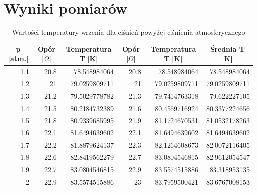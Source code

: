 \documentclass{article}
\begin{document}

 


\section{Wyniki pomiarów}

\begin{table}[htbp]
\centering
\begin{tabular}{|r|r|r|r|r|r|}
\hline
\multicolumn{1}{|c|}{p [atm.]} & \multicolumn{1}{c|}{Opór [$\Omega$]} & \multicolumn{1}{c|}{Temperatura T [K]} & \multicolumn{1}{c|}{Opór [$\Omega$]} & \multicolumn{1}{c|}{Temperatura T [K]} & \multicolumn{1}{c|}{Średnia T [K]} \\ \hline
1.1 & 20.8 & 78.548984064 & 20.8 & 78.548984064 & 78.548984064 \\ \hline
1.2 & 21 & 79.0259809711 & 21 & 79.0259809711 & 79.0259809711 \\ \hline
1.3 & 21.2 & 79.5029778782 & 21.3 & 79.7414763318 & 79.622227105 \\ \hline
1.4 & 21.5 & 80.2184732389 & 21.6 & 80.4569716924 & 80.3377224656 \\ \hline
1.5 & 21.8 & 80.9339685995 & 21.9 & 81.1724670531 & 81.0532178263 \\ \hline
1.6 & 22.1 & 81.6494639602 & 22.1 & 81.6494639602 & 81.6494639602 \\ \hline
1.7 & 22.2 & 81.8879624137 & 22.3 & 82.1264608673 & 82.0072116405 \\ \hline
1.8 & 22.6 & 82.8419562279 & 22.7 & 83.0804546815 & 82.9612054547 \\ \hline
1.9 & 22.7 & 83.0804546815 & 22.9 & 83.5574515886 & 83.318953135 \\ \hline
2 & 22.9 & 83.5574515886 & 23 & 83.7959500421 & 83.6767008153 \\ \hline
\end{tabular}
\caption{Wartości temperatury wrzenia dla ciśnień powyżej ciśnienia atmosferycznego}
\label{}
\end{table}
\end{document}
